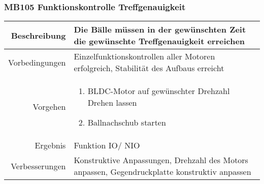 \subsubsection{MB105 Funktionskontrolle Treffgenauigkeit }
\begin{table}[h!]
	\renewcommand{\arraystretch}{1.5}
	\begin{tabular}{|r|p{13cm}|}
		\hline Beschreibung & Die Bälle müssen in der gewünschten Zeit die gewünschte Treffgenauigkeit erreichen   \\ 
		\hline Vorbedingungen & Einzelfunktionskontrollen aller Motoren erfolgreich, Stabilität des Aufbaus erreicht \\ 
		\hline Vorgehen & 
		\begin{enumerate}
			\item BLDC-Motor auf gewünschter Drehzahl Drehen lassen 
			\item Ballnachschub starten 
		\end{enumerate} \\ 
		\hline Ergebnis & Funktion IO/ NIO \\ 
		\hline Verbesserungen & Konstruktive Anpassungen, Drehzahl des Motors anpassen, Gegendruckplatte konstruktiv anpassen \\ 
		\hline 
	\end{tabular}
\end{table}